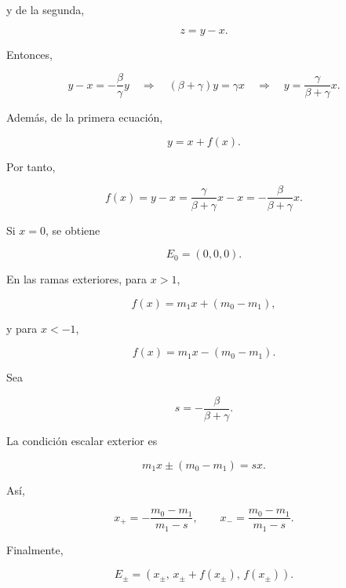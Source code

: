 \documentclass[11pt]{article}
\begin{document}
y de la segunda,

\begin{equation}
z=y-x.
\end{equation}

Entonces,

\begin{equation}
y-x=-\frac{\beta}{\gamma}y
\quad\Longrightarrow\quad
(\beta+\gamma)y=\gamma x
\quad\Longrightarrow\quad
y=\frac{\gamma}{\beta+\gamma}x.
\end{equation}

Además, de la primera ecuación,

\begin{equation}
y=x+f(x).
\end{equation}

Por tanto,

\begin{equation}
f(x)=y-x=\frac{\gamma}{\beta+\gamma}x-x
=
-\frac{\beta}{\beta+\gamma}x.
\end{equation}

Si \(x=0\), se obtiene

\begin{equation}
E_0=(0,0,0).
\end{equation}

En las ramas exteriores, para \(x>1\),

\begin{equation}
f(x)=m_1x+(m_0-m_1),
\end{equation}

y para \(x<-1\),

\begin{equation}
f(x)=m_1x-(m_0-m_1).
\end{equation}

Sea

\begin{equation}
s=-\frac{\beta}{\beta+\gamma}.
\end{equation}

La condición escalar exterior es

\begin{equation}
m_1x\pm(m_0-m_1)=sx.
\end{equation}

Así,

\begin{equation}
x_+=-\frac{m_0-m_1}{m_1-s},
\qquad
x_-=\frac{m_0-m_1}{m_1-s}.
\end{equation}

Finalmente,

\begin{equation}
E_\pm =
\left(
x_\pm,\,
x_\pm+f(x_\pm),\,
f(x_\pm)
\right).
\end{equation}
\end{document}
